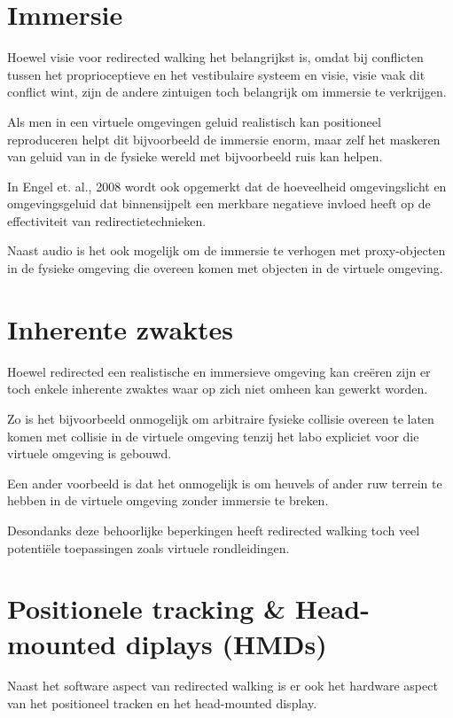 \section{Immersie}
Hoewel visie voor redirected walking het belangrijkst is, omdat bij conflicten
tussen het proprioceptieve en het vestibulaire systeem en visie, visie vaak dit
conflict wint\cite{berthoz02,dichgans78,bruder08}, zijn de andere zintuigen toch
belangrijk om immersie te verkrijgen. 

Als men in een virtuele omgevingen geluid realistisch kan positioneel
reproduceren helpt dit bijvoorbeeld de immersie enorm\cite{lackner77}, maar zelf
het maskeren van geluid van in de fysieke wereld met bijvoorbeeld ruis kan
helpen\cite{usoh99}.

In Engel et. al., 2008\cite{engel08} wordt ook opgemerkt dat de hoeveelheid 
omgevingslicht en omgevingsgeluid dat binnensijpelt een merkbare negatieve 
invloed heeft op de effectiviteit van redirectietechnieken.

Naast audio is het ook mogelijk om de immersie te verhogen met proxy-objecten in
de fysieke omgeving die overeen komen met objecten in de virtuele 
omgeving\cite{steinicke09}.


\section{Inherente zwaktes}
Hoewel redirected een realistische en immersieve omgeving kan cre\"eren zijn er
toch enkele inherente zwaktes waar op zich niet omheen kan gewerkt worden.

Zo is het bijvoorbeeld onmogelijk om arbitraire fysieke collisie overeen te laten
komen met collisie in de virtuele omgeving tenzij het labo expliciet voor die
virtuele omgeving is gebouwd.

Een ander voorbeeld is dat het onmogelijk is om heuvels of ander ruw terrein te
hebben in de virtuele omgeving zonder immersie te breken.

Desondanks deze behoorlijke beperkingen heeft redirected walking toch veel
potenti\"ele toepassingen zoals virtuele rondleidingen.


\section{Positionele tracking \& Head-mounted diplays (HMDs)}
Naast het software aspect van redirected walking is er ook het hardware aspect
van het positioneel tracken en het head-mounted display.

